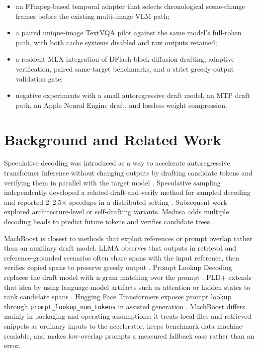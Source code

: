 \documentclass[11pt]{article}
\begin{document}
\begin{itemize}[leftmargin=*]
  \item an FFmpeg-based temporal adapter that selects chronological scene-change frames before the existing multi-image VLM path;
  \item a paired unique-image TextVQA pilot against the same model's full-token path, with both cache systems disabled and raw outputs retained;
  \item a resident MLX integration of DFlash block-diffusion drafting, adaptive verification, paired same-target benchmarks, and a strict greedy-output validation gate;
  \item negative experiments with a small autoregressive draft model, an MTP draft path, an Apple Neural Engine draft, and lossless weight compression.
\end{itemize}

\section{Background and Related Work}
Speculative decoding was introduced as a way to accelerate autoregressive transformer inference without changing outputs by drafting candidate tokens and verifying them in parallel with the target model \cite{leviathan2023speculative}. Speculative sampling independently developed a related draft-and-verify method for sampled decoding and reported 2--2.5$\times$ speedups in a distributed setting \cite{chen2023speculative}. Subsequent work explored architecture-level or self-drafting variants. Medusa adds multiple decoding heads to predict future tokens and verifies candidate trees \cite{cai2024medusa}.

MachBoost is closest to methods that exploit references or prompt overlap rather than an auxiliary draft model. LLMA observes that outputs in retrieval and reference-grounded scenarios often share spans with the input reference, then verifies copied spans to preserve greedy output \cite{yang2023llma}. Prompt Lookup Decoding replaces the draft model with n-gram matching over the prompt \cite{saxena2023promptlookup}; PLD+ extends that idea by using language-model artifacts such as attention or hidden states to rank candidate spans \cite{somasundaram2024pldplus}. Hugging Face Transformers exposes prompt lookup through \texttt{prompt\_lookup\_num\_tokens} in assisted generation \cite{huggingface2026assisted}. MachBoost differs mainly in packaging and operating assumptions: it treats local files and retrieved snippets as ordinary inputs to the accelerator, keeps benchmark data machine-readable, and makes low-overlap prompts a measured fallback case rather than an error.
\end{document}
